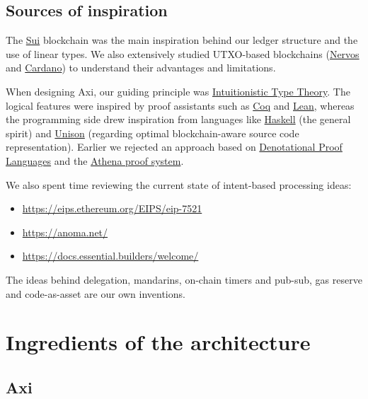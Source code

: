 \documentclass[a4paper]{article}
\begin{document}
\subsection{Sources of inspiration}

The \href{https://sui.io/}{Sui} blockchain was the main inspiration behind our ledger structure and the use of linear types. We also extensively studied UTXO-based blockchains (\href{https://www.nervos.org/}{Nervos} and \href{https://cardano.org/}{Cardano}) to understand their advantages and limitations.

When designing Axi, our guiding principle was \href{https://en.wikipedia.org/wiki/Intuitionistic_type_theory}{Intuitionistic Type Theory}. The logical features were inspired by proof assistants such as \href{https://rocq-prover.org/}{Coq} and \href{https://lean-lang.org/}{Lean}, whereas the programming side drew inspiration from languages like \href{https://www.haskell.org/}{Haskell} (the general spirit) and \href{https://www.unison-lang.org/}{Unison} (regarding optimal blockchain-aware source code representation). Earlier we rejected an approach based on \href{https://people.csail.mit.edu/kostas/dpls/dpl-dissertation.pdf}{Denotational Proof Languages} and the \href{https://athena-lang.org/learn}{Athena proof system}.

We also spent time reviewing the current state of intent-based processing ideas:

\begin{itemize}
  \item \href{https://eips.ethereum.org/EIPS/eip-7521}{https://eips.ethereum.org/EIPS/eip-7521}
  \item \href{https://anoma.net/}{https://anoma.net/}
  \item \href{https://docs.essential.builders/welcome/}{https://docs.essential.builders/welcome/}
\end{itemize}

The ideas behind delegation, mandarins, on-chain timers and pub-sub, gas reserve and code-as-asset are our own inventions.

\section{Ingredients of the architecture}

\subsection{Axi}
\end{document}
